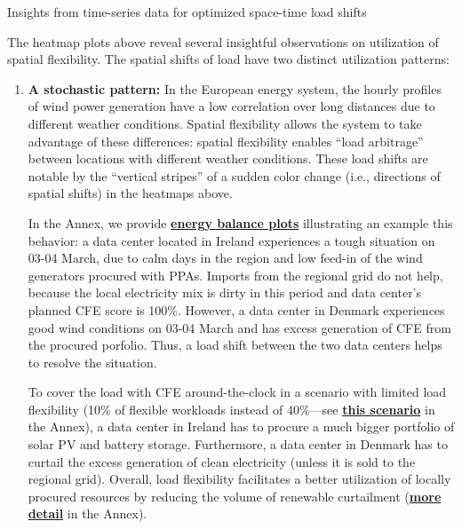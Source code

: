 \begin{frame}{Insights from time-series data for optimized space-time load shifts}

  {\footnotesize 

  \vspace{-0.1cm}
  The heatmap plots above reveal several insightful observations on utilization of spatial flexibility. The spatial shifts of load have two distinct utilization patterns:

  \vspace{-0.2cm}
  \begin{enumerate}
    \item {\bf A stochastic pattern:} In the European energy system, the hourly profiles of wind power generation have a low correlation over long distances due to different weather conditions. Spatial flexibility allows the system to take advantage of these differences: spatial flexibility enables \enquote{load arbitrage} between locations with different weather conditions. These load shifts are notable by the \enquote{vertical stripes} of a sudden color change (i.e., directions of spatial shifts) in the heatmaps above.

    \vspace{0.1cm}
    In the Annex, we provide {\bf \hyperlink{nb1-40}{energy balance plots}} illustrating an example this behavior: a data center located in Ireland experiences a tough situation on 03-04 March, due to calm days in the region and low feed-in of the wind generators procured with PPAs. Imports from the regional grid do not help, because the local electricity mix is dirty in this period and data center's planned CFE score is 100\%. However, a data center in Denmark experiences good wind conditions on 03-04 March and has excess generation of CFE from the procured porfolio. Thus, a load shift between the two data centers helps to resolve the situation. 
    
    \vspace{0.1cm}
    To cover the load with CFE around-the-clock in a scenario with limited load flexibility (10\% of flexible workloads instead of 40\%---see {\bf \hyperlink{nb1-10}{this scenario}} in the Annex), a data center in Ireland has to procure a \alert{much bigger portfolio} of solar PV and battery storage. Furthermore, a data center in Denmark has to curtail the excess generation of clean electricity (unless it is sold to the regional grid). Overall, load flexibility facilitates a \alert{better utilization} of locally procured resources by reducing the volume of renewable curtailment ({\bf \hyperlink{curtailment}{more detail}} in the Annex).

  \end{enumerate}
  }
\end{frame}


